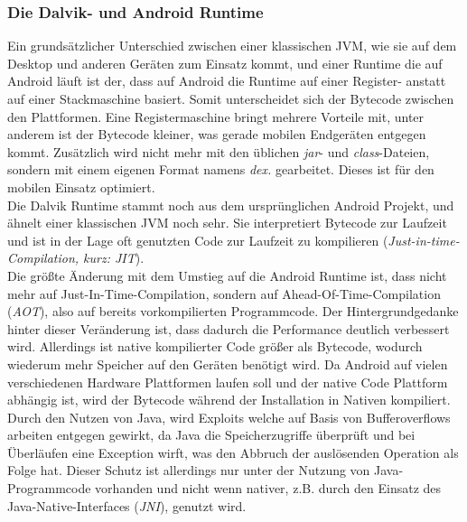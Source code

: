\subsubsection{Die Dalvik- und Android Runtime}
Ein grundsätzlicher Unterschied zwischen einer klassischen JVM, wie sie auf dem Desktop und anderen Geräten zum Einsatz kommt, und einer Runtime die auf Android läuft ist der, dass auf Android die Runtime auf einer Register- anstatt auf einer Stackmaschine basiert. Somit unterscheidet sich der Bytecode zwischen den Plattformen. Eine Registermaschine bringt mehrere Vorteile mit, unter anderem ist der Bytecode kleiner, was gerade mobilen Endgeräten entgegen kommt.
Zusätzlich wird nicht mehr mit den üblichen \textit{jar}- und \textit{class}-Dateien, sondern mit einem eigenen Format namens \textit{dex.} gearbeitet. Dieses ist für den mobilen Einsatz optimiert.\\
Die Dalvik Runtime stammt noch aus dem ursprünglichen Android Projekt, und ähnelt einer klassischen JVM noch sehr. Sie interpretiert Bytecode zur Laufzeit und ist in der Lage oft genutzten Code zur Laufzeit zu kompilieren (\textit{Just-in-time-Compilation, kurz: JIT}). \\
Die größte Änderung mit dem Umstieg auf die Android Runtime ist, dass nicht mehr auf Just-In-Time-Compilation, sondern auf Ahead-Of-Time-Compilation (\textit{AOT}), also auf bereits vorkompilierten Programmcode. Der Hintergrundgedanke hinter dieser Veränderung ist, dass dadurch die Performance deutlich verbessert wird. Allerdings ist native kompilierter Code größer als Bytecode, wodurch wiederum mehr Speicher auf den Geräten benötigt wird.
Da Android auf vielen verschiedenen Hardware Plattformen laufen soll und der native Code Plattform abhängig ist, wird der Bytecode während der Installation in Nativen kompiliert.\\
Durch den Nutzen von Java, wird Exploits welche auf Basis von Bufferoverflows arbeiten entgegen gewirkt, da Java die Speicherzugriffe überprüft und bei Überläufen eine Exception wirft, was den Abbruch der auslösenden Operation als Folge hat. Dieser Schutz ist allerdings nur unter der Nutzung von Java-Programmcode vorhanden und nicht wenn nativer, z.B. durch den Einsatz des Java-Native-Interfaces (\textit{JNI}), genutzt wird.